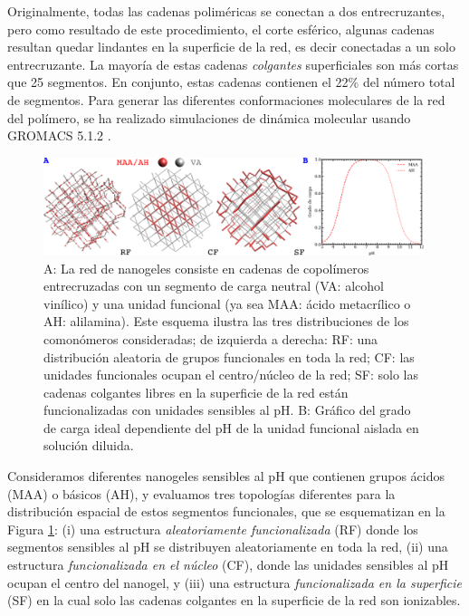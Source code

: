 Originalmente, todas las cadenas polim\'ericas se  conectan a dos entrecruzantes, pero como resultado de este procedimiento, el corte esf\'erico, algunas cadenas resultan quedar lindantes en la superficie de la red, es decir  conectadas a un solo entrecruzante. La mayor\'ia de estas cadenas \emph{colgantes} superficiales son m\'as cortas que 25 segmentos. En conjunto, estas cadenas contienen el 22\% del n\'umero total de segmentos. Para generar las diferentes conformaciones moleculares de la red del pol\'imero, se ha realizado simulaciones de din\'amica molecular usando GROMACS 5.1.2 \cite{lindahl2001gromacs}.

 \begin{figure}[!htb]
     \centering
     \includegraphics[width=0.99\textwidth]{Figures/graphs-gel2/ideal-charge-model.pdf}
     \caption{A: La red de nanogeles consiste en cadenas de copol\'imeros entrecruzadas con un segmento de carga neutral (VA: alcohol vin\'ilico) y una unidad funcional (ya sea MAA: \'acido metacr\'ilico o AH: alilamina).
     	Este esquema ilustra las tres distribuciones de los comon\'omeros consideradas; de izquierda a derecha: RF: una distribuci\'on aleatoria de grupos funcionales en toda la red; CF: las unidades funcionales ocupan el centro/n\'ucleo de la red; SF: solo las cadenas colgantes libres en la superficie de la red est\'an funcionalizadas con unidades sensibles al pH.
     	B: Gr\'afico del grado de carga ideal dependiente del pH de la unidad funcional aislada en soluci\'on diluida.}
     \label{fig:esf:gel-topologies}
 \end{figure}


 
 
 Consideramos diferentes nanogeles sensibles al pH que contienen grupos \'acidos (MAA) o b\'asicos (AH), y evaluamos tres topolog\'ias diferentes para la distribuci\'on espacial de estos segmentos funcionales, que se esquematizan en la Figura \ref{fig:esf:gel-topologies}:
 (i) una estructura \emph{aleatoriamente funcionalizada} (RF) donde los segmentos sensibles al pH se distribuyen aleatoriamente en toda la red,
 (ii) una estructura \emph{funcionalizada en el n\'ucleo} (CF), donde las unidades sensibles al pH ocupan el centro del nanogel, y
 (iii) una estructura \emph{funcionalizada en la superficie} (SF) en la cual solo las cadenas colgantes en la superficie de la red son ionizables.
  







